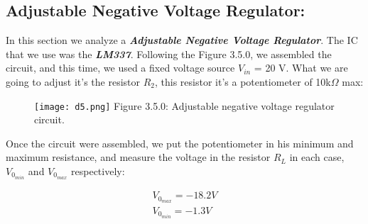 \subsection{Adjustable Negative Voltage Regulator:}

In this section we analyze a {\bfseries\itshape Adjustable Negative Voltage Regulator}. The IC that we use was the {\bfseries\itshape LM337}. Following the Figure 3.5.0, we assembled the circuit, and this time, we used a fixed voltage source $V_{in}$ = 20 V. What we are going to adjust it's the resistor $R_{2}$, this resistor it's a potentiometer of 10k$\Omega$ max:

\begin{figure}[H]
\texttt{[image: d5.png]}
\centering \linebreak \linebreak Figure 3.5.0: Adjustable negative voltage regulator circuit.
\end{figure}

Once the circuit were assembled, we put the potentiometer in his minimum and maximum resistance, and measure the voltage in the resistor $R_{L}$ in each case, $V_{0_{min}}$ and $V_{0_{max}}$ respectively: \hfill \break

{\bfseries\itshape\color{armygreen}{Observation:}} {\itshape{}} \hfill

\begin{ceqn}
\begin{align}
V_{0_{max}} = -18.2 V \\
V_{0_{min}} = -1.3 V
\end{align}
\end{ceqn}

\pagebreak